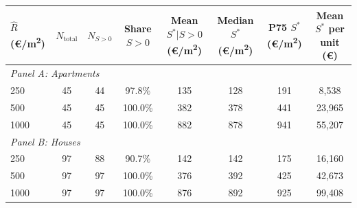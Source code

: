 \begin{tabular}{lccccccc}
  \toprule\toprule
  $\hat R$ (\euro/m\textsuperscript{2}) & $N_{\text{total}}$ & $N_{S>0}$ & Share $S>0$ & Mean $S^* | S>0$ (\euro/m\textsuperscript{2}) & Median $S^*$ (\euro/m\textsuperscript{2}) & P75 $S^*$ (\euro/m\textsuperscript{2}) & Mean $S^*$ per unit (\euro) \\
  \midrule
  \multicolumn{8}{l}{\textit{Panel A: Apartments}} \\
  \midrule
    250 & 45 & 44 & 97.8\% & 135 & 128 & 191 & 8,538 \\
    500 & 45 & 45 & 100.0\% & 382 & 378 & 441 & 23,965 \\
    1000 & 45 & 45 & 100.0\% & 882 & 878 & 941 & 55,207 \\
  \midrule
  \multicolumn{8}{l}{\textit{Panel B: Houses}} \\
  \midrule
    250 & 97 & 88 & 90.7\% & 142 & 142 & 175 & 16,160 \\
    500 & 97 & 97 & 100.0\% & 376 & 392 & 425 & 42,673 \\
    1000 & 97 & 97 & 100.0\% & 876 & 892 & 925 & 99,408 \\
  \midrule
  \bottomrule\bottomrule
\end{tabular}
